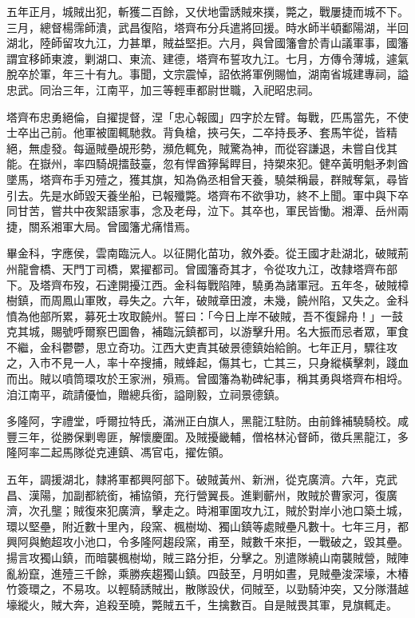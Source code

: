 \begin{pinyinscope}
五年正月，城賊出犯，斬獲二百餘，又伏地雷誘賊來撲，斃之，戰屢捷而城不下。三月，總督楊霈師潰，武昌復陷，塔齊布分兵遣將回援。時水師半頓鄱陽湖，半回湖北，陸師留攻九江，力甚單，賊益堅拒。六月，與曾國籓會於青山議軍事，國籓謂宜移師東渡，剿湖口、東流、建德，塔齊布誓攻九江。七月，方傳令薄城，遽氣脫卒於軍，年三十有九。事聞，文宗震悼，詔依將軍例賜恤，湖南省城建專祠，謚忠武。同治三年，江南平，加三等輕車都尉世職，入祀昭忠祠。

塔齊布忠勇絕倫，自擢提督，涅「忠心報國」四字於左臂。每戰，匹馬當先，不使士卒出己前。他軍被圍輒馳救。背負槍，挾弓矢，二卒持長矛、套馬竿從，皆精絕，無虛發。每逼賊壘覘形勢，瀕危輒免，賊驚為神，而從容謙退，未嘗自伐其能。在嶽州，率四騎覘擂鼓臺，忽有悍酋獰髯睅目，持槊來犯。健卒黃明魁矛刺酋墜馬，塔齊布手刃殪之，獲其旗，知為偽丞相曾天養，驍桀稱最，群賊奪氣，尋皆引去。先是水師毀天養坐船，已報殲斃。塔齊布不欲爭功，終不上聞。軍中與下卒同甘苦，嘗共中夜絮語家事，念及老母，泣下。其卒也，軍民皆慟。湘潭、岳州兩捷，關系湘軍大局。曾國籓尤痛惜焉。

畢金科，字應侯，雲南臨沅人。以征開化苗功，敘外委。從王國才赴湖北，破賊荊州龍會橋、天門丁司橋，累擢都司。曾國籓奇其才，令從攻九江，改隸塔齊布部下。及塔齊布歿，石達開擾江西。金科每戰陷陣，驍勇為諸軍冠。五年冬，破賊樟樹鎮，而周鳳山軍敗，尋失之。六年，破賊章田渡，未幾，饒州陷，又失之。金科憤為他部所累，募死士攻取饒州。誓曰：「今日上岸不破賊，吾不復歸舟！」一鼓克其城，賜號呼爾察巴圖魯，補臨沅鎮都司，以游擊升用。名大振而忌者眾，軍食不繼，金科鬱鬱，思立奇功。江西大吏責其破景德鎮始給餉。七年正月，驟往攻之，入市不見一人，率十卒搜捕，賊蜂起，傷其七，亡其三，只身縱橫擊刺，踐血而出。賊以噴筒環攻於王家洲，殞焉。曾國籓為勒碑紀事，稱其勇與塔齊布相埒。洎江南平，疏請優恤，贈總兵銜，謚剛毅，立祠景德鎮。

多隆阿，字禮堂，呼爾拉特氏，滿洲正白旗人，黑龍江駐防。由前鋒補驍騎校。咸豐三年，從勝保剿粵匪，解懷慶圍。及賊擾畿輔，僧格林沁督師，徵兵黑龍江，多隆阿率二起馬隊從克連鎮、馮官屯，擢佐領。

五年，調援湖北，隸將軍都興阿部下。破賊黃州、新洲，從克廣濟。六年，克武昌、漢陽，加副都統銜，補協領，充行營翼長。進剿蘄州，敗賊於曹家河，復廣濟，次孔壟；賊復來犯廣濟，擊走之。時湘軍圍攻九江，賊於對岸小池口築土城，環以堅壘，附近數十里內，段窯、楓樹坳、獨山鎮等處賊壘凡數十。七年三月，都興阿與鮑超攻小池口，令多隆阿趨段窯，甫至，賊數千來拒，一戰破之，毀其壘。揚言攻獨山鎮，而暗襲楓樹坳，賊三路分拒，分擊之。別遣隊繞山南襲賊營，賊陣亂紛竄，進殪三千餘，乘勝疾趨獨山鎮。四鼓至，月明如晝，見賊壘浚深壕，木椿竹簽環之，不易攻。以輕騎誘賊出，散隊設伏，伺賊至，以勁騎沖突，又分隊潛越壕縱火，賊大奔，追殺至曉，斃賊五千，生擒數百。自是賊畏其軍，見旗輒走。


\end{pinyinscope}
